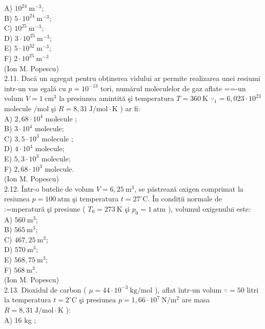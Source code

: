 \documentclass[10pt]{article}
\begin{document}
A) $10^{24} \mathrm{~m}^{-3}$;\\
B) $5 \cdot 10^{24} \mathrm{~m}^{-3}$;\\
C) $10^{25} \mathrm{~m}^{-3}$;\\
D) $3 \cdot 10^{25} \mathrm{~m}^{-3}$;\\
E) $5 \cdot 10^{32} \mathrm{~m}^{-3}$;\\
F) $2 \cdot 10^{25} \mathrm{~m}^{-3}$\\
(Ion M. Popescu)\\
2.11. Dacă un agregat pentru obținerea vidului ar permite realizarea unei resiumi intr-un vas egală cu $p=10^{-13}$ tori, numărul moleculelor de gaz aflate ==-un volum $V=1 \mathrm{~cm}^{3}$ la presiunea amintită şi temperatura $T=360 \mathrm{~K}$ $\because_{1}=6,023 \cdot 10^{23}$ molecule $/ \mathrm{mol}$ şi $R=8,31 \mathrm{~J} / \mathrm{mol} \cdot \mathrm{K}$ ) ar fi:\\
A) $2,68 \cdot 10^{4}$ molecule ;\\
B) $3 \cdot 10^{4}$ molecule;\\
C) $3,5 \cdot 10^{3}$ molecule ;\\
D) $4 \cdot 10^{4}$ molecule;\\
E) $5,3 \cdot 10^{3}$ molecule;\\
F) $2,68 \cdot 10^{3}$ molecule.\\
(Ion M. Popescu)\\
2.12. Într-o butelie de volum $V=6,25 \mathrm{~m}^{3}$, se păstrează oxigen comprimat la resiunea $p=100 \mathrm{~atm}$ şi temperatura $t=27^{\circ} \mathrm{C}$. În condiții normale de :=mperatură şi presiune ( $T_{0}=273 \mathrm{~K}$ şi $p_{0}=1 \mathrm{~atm}$ ), volumul oxigenului este:\\
A) $560 \mathrm{~m}^{3}$;\\
B) $565 \mathrm{~m}^{3}$;\\
C) $467,25 \mathrm{~m}^{3}$;\\
D) $570 \mathrm{~m}^{3}$;\\
E) $568,75 \mathrm{~m}^{3}$;\\
F) $568 \mathrm{~m}^{3}$.\\
(Ion M. Popescu)\\
2.13. Dioxidul de carbon ( $\mu=44 \cdot 10^{-3} \mathrm{~kg} / \mathrm{mol}$ ), aflat într-un volum $\because=50$ litri la temperatura $t=2^{\circ} \mathrm{C}$ şi presiunea $p=1,66 \cdot 10^{7} \mathrm{~N} / \mathrm{m}^{2}$ are masa $R=8,31 \mathrm{~J} / \mathrm{mol} \cdot \mathrm{K}$ ):\\
A) 16 kg ;\\
\end{document}
